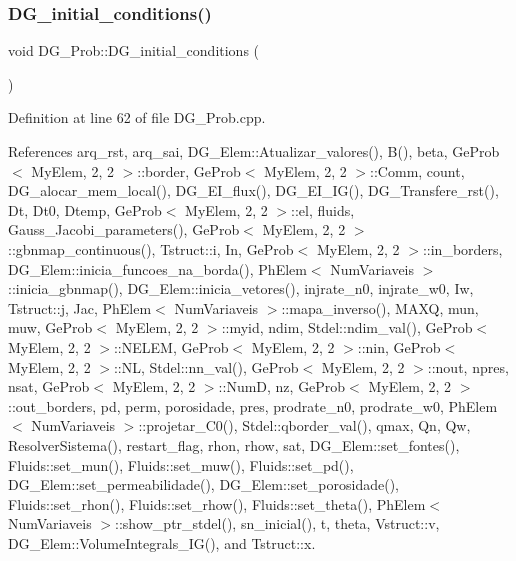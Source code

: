 \mbox{\label{classDG__Prob_a8241ca6884495f863179ea86129b055e}} 
\subsubsection{\texorpdfstring{D\+G\+\_\+initial\+\_\+conditions()}{DG\_initial\_conditions()}}
{\footnotesize\ttfamily void D\+G\+\_\+\+Prob\+::\+D\+G\+\_\+initial\+\_\+conditions (\begin{DoxyParamCaption}{ }\end{DoxyParamCaption})}



Definition at line 62 of file D\+G\+\_\+\+Prob.\+cpp.



References arq\+\_\+rst, arq\+\_\+sai, D\+G\+\_\+\+Elem\+::\+Atualizar\+\_\+valores(), B(), beta, Ge\+Prob$<$ My\+Elem, 2, 2 $>$\+::border, Ge\+Prob$<$ My\+Elem, 2, 2 $>$\+::\+Comm, count, D\+G\+\_\+alocar\+\_\+mem\+\_\+local(), D\+G\+\_\+\+E\+I\+\_\+flux(), D\+G\+\_\+\+E\+I\+\_\+\+I\+G(), D\+G\+\_\+\+Transfere\+\_\+rst(), Dt, Dt0, Dtemp, Ge\+Prob$<$ My\+Elem, 2, 2 $>$\+::el, fluids, Gauss\+\_\+\+Jacobi\+\_\+parameters(), Ge\+Prob$<$ My\+Elem, 2, 2 $>$\+::gbnmap\+\_\+continuous(), Tstruct\+::i, In, Ge\+Prob$<$ My\+Elem, 2, 2 $>$\+::in\+\_\+borders, D\+G\+\_\+\+Elem\+::inicia\+\_\+funcoes\+\_\+na\+\_\+borda(), Ph\+Elem$<$ Num\+Variaveis $>$\+::inicia\+\_\+gbnmap(), D\+G\+\_\+\+Elem\+::inicia\+\_\+vetores(), injrate\+\_\+n0, injrate\+\_\+w0, Iw, Tstruct\+::j, Jac, Ph\+Elem$<$ Num\+Variaveis $>$\+::mapa\+\_\+inverso(), M\+A\+XQ, mun, muw, Ge\+Prob$<$ My\+Elem, 2, 2 $>$\+::myid, ndim, Stdel\+::ndim\+\_\+val(), Ge\+Prob$<$ My\+Elem, 2, 2 $>$\+::\+N\+E\+L\+EM, Ge\+Prob$<$ My\+Elem, 2, 2 $>$\+::nin, Ge\+Prob$<$ My\+Elem, 2, 2 $>$\+::\+NL, Stdel\+::nn\+\_\+val(), Ge\+Prob$<$ My\+Elem, 2, 2 $>$\+::nout, npres, nsat, Ge\+Prob$<$ My\+Elem, 2, 2 $>$\+::\+NumD, nz, Ge\+Prob$<$ My\+Elem, 2, 2 $>$\+::out\+\_\+borders, pd, perm, porosidade, pres, prodrate\+\_\+n0, prodrate\+\_\+w0, Ph\+Elem$<$ Num\+Variaveis $>$\+::projetar\+\_\+\+C0(), Stdel\+::qborder\+\_\+val(), qmax, Qn, Qw, Resolver\+Sistema(), restart\+\_\+flag, rhon, rhow, sat, D\+G\+\_\+\+Elem\+::set\+\_\+fontes(), Fluids\+::set\+\_\+mun(), Fluids\+::set\+\_\+muw(), Fluids\+::set\+\_\+pd(), D\+G\+\_\+\+Elem\+::set\+\_\+permeabilidade(), D\+G\+\_\+\+Elem\+::set\+\_\+porosidade(), Fluids\+::set\+\_\+rhon(), Fluids\+::set\+\_\+rhow(), Fluids\+::set\+\_\+theta(), Ph\+Elem$<$ Num\+Variaveis $>$\+::show\+\_\+ptr\+\_\+stdel(), sn\+\_\+inicial(), t, theta, Vstruct\+::v, D\+G\+\_\+\+Elem\+::\+Volume\+Integrals\+\_\+\+I\+G(), and Tstruct\+::x.




